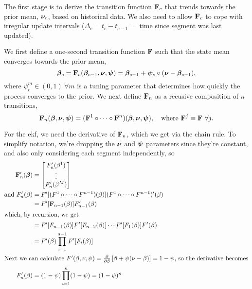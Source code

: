 \documentclass[draftcls,a4paper,onecolumn]{IEEEtran}\usepackage[]{graphicx}\usepackage[]{color}
\begin{document}
The first stage is to derive the transition function $\mathbf{F}_c$ that
trends towards the prior mean, $\boldsymbol{\nu}_c$, based on historical data.
We also need to allow $\mathbf{F}_c$ to cope with irregular update intervals 
($\Delta_c = t_c - t_{c-1} = $ time since segment was last updated).

We first define a one-second transition function $\mathbf{F}$ such that the state mean
converges towards the prior mean,
\begin{equation}
  \label{eq:kf_trans1}
  \boldsymbol{\beta}_{c} = \mathbf{F}_c(\boldsymbol{\beta}_{c-1}, \boldsymbol{\nu}, \boldsymbol{\psi}) = \boldsymbol{\beta}_{c-1} + \boldsymbol{\psi}_c\circ(\boldsymbol{\nu} - \boldsymbol{\beta}_{c-1}),
\end{equation}
where $\psi^m_c \in (0, 1)\ \forall m$ is a tuning parameter that determines how quickly
the process converges to the prior.
We next define $\mathbf{F}_n$ as a recusive composition of $n$ transitions,
\begin{equation}
  \label{eq:kf_transf}
\mathbf{F}_n(\boldsymbol{\beta}, \boldsymbol{\nu}, \boldsymbol{\psi}) =
(\mathbf{F}^1\circ \cdots \circ \mathbf{F}^n) (\boldsymbol{\beta}, \boldsymbol{\nu}, \boldsymbol{\psi}),\quad
\text{where } \mathbf{F}^j \equiv \mathbf{F}\ \forall j.
\end{equation}

For the \gls{ekf}, we need the derivative of $\mathbf{F}_n$, which we get via the chain rule.
To simplify notation, we're dropping the $\boldsymbol{\nu}$ and $\boldsymbol{\psi}$ parameters since they're constant,
and also only considering each segment independently, so
\begin{align}
  \label{eq:kf_deriv}
  \mathbf{F}_n' (\boldsymbol{\beta}) &= 
    \begin{bmatrix}
      F_n' (\beta^1) \\ \vdots \\ F_n' (\beta^M)
    \end{bmatrix}\nonumber \\
  \text{and } F_n'(\beta)\nonumber
    &= F'[(F^1\circ \cdots \circ F^{n-1})(\beta)]
      (F^1\circ \cdots \circ F^{n-1})'(\beta) \nonumber \\
    &= F'[\mathbf{F}_{n-1}(\beta)] F'_{n-1}(\beta) \nonumber \\
  \intertext{which, by recursion, we get}
    &= F'[F_{n-1}(\beta)] F'[F_{n-2}(\beta)] \cdots F'[F_1(\beta)] F'(\beta) \nonumber \\
    &= F'(\beta) \prod_{i=1}^{n-1} F'[F_i(\beta)] \nonumber \\
  \intertext{Next we can calculate 
  $F'(\beta, \nu, \psi) = \frac{\partial}{\partial \beta} \left[\beta + \psi(\nu - \beta)\right] = 1 - \psi$,
  so the derivative becomes}
    F'_n(\beta) &= (1-\psi) \prod_{i=1}^n (1 - \psi) = (1-\psi)^n
\end{align}
\end{document}
